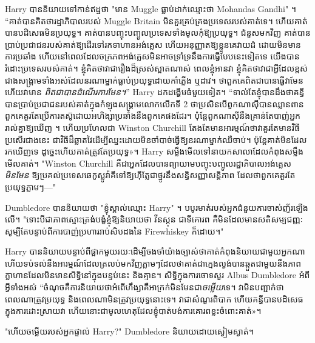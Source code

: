 {Harry បាននិយាយទៅកាន់ឥដ្ឋថា "មាន Muggle ធ្លាប់ដាក់ឈ្មោះថា Mohandas Gandhi" ។ “គាត់បានគិតថារដ្ឋាភិបាលរបស់ Muggle Britain មិនគួរគ្រប់គ្រងប្រទេសរបស់គាត់ទេ។ ហើយគាត់បានបដិសេធមិនប្រយុទ្ធ។ គាត់​បាន​បញ្ចុះបញ្ចូល​ប្រទេស​ទាំងមូល​កុំ​ឱ្យ​ប្រយុទ្ធ​។ ជំនួសមកវិញ គាត់បានប្រាប់ប្រជាជនរបស់គាត់ឱ្យដើរទៅរកទាហានអង់គ្លេស ហើយអនុញ្ញាតឱ្យខ្លួនគេវាយដំ ដោយមិនមានការប្រឆាំង ហើយនៅពេលដែលចក្រភពអង់គ្លេសមិនអាចទ្រាំទ្រនឹងការធ្វើបែបនេះទៀតទេ យើងបានរំដោះប្រទេសរបស់គាត់។ ខ្ញុំ​គិត​ថា​វា​ជា​រឿង​ដ៏​ស្រស់​ស្អាត​ណាស់ ពេល​ខ្ញុំ​អាន​វា ខ្ញុំ​គិត​ថា​វា​ជា​អ្វី​ដែល​ខ្ពស់​ជាង​សង្គ្រាម​ទាំង​អស់​ដែល​នរណា​ម្នាក់​ធ្លាប់​ប្រយុទ្ធ​ដោយ​កាំភ្លើង ឬ​ដាវ។ ថាពួកគេពិតជាបានធ្វើវាមែន ហើយវាមាន \emph{ពិតជាបានដំណើរការមែន។}” Harry ដកដង្ហើមធំមួយទៀត។ “ទាល់តែខ្ញុំបានដឹងថាគន្ធីបានប្រាប់ប្រជាជនរបស់គាត់ក្នុងកំឡុងសង្គ្រាមលោកលើកទី 2 ថាប្រសិនបើពួកណាស៊ីបានឈ្លានពានពួកគេគួរតែប្រើការតស៊ូដោយអហិង្សាប្រឆាំងនឹងពួកគេផងដែរ។ ប៉ុន្តែ​ពួក​ណា​ស៊ី​នឹង​គ្រាន់តែ​បាញ់​អ្នក​រាល់​គ្នា​ឱ្យ​ឃើញ ។ ហើយប្រហែលជា Winston Churchill តែងតែមានអារម្មណ៍ថាវាគួរតែមានវិធីប្រសើរជាងនេះ ជាវិធីដ៏ឆ្លាតវៃដើម្បីឈ្នះដោយមិនចាំបាច់ធ្វើឱ្យនរណាម្នាក់ឈឺចាប់។ ប៉ុន្តែ​គាត់​មិន​ដែល​រក​ឃើញ​ទេ ដូច្នេះ​ហើយ​គាត់​ត្រូវ​តែ​ប្រយុទ្ធ»។ Harry សម្លឹងមើលទៅនាយកសាលាដែលកំពុងសម្លឹងមើលគាត់។ "Winston Churchill គឺជាអ្នកដែលបានព្យាយាមបញ្ចុះបញ្ចូលរដ្ឋាភិបាលអង់គ្លេស\emph{មិនមែន} ឱ្យប្រគល់ប្រទេសឆេកូស្លូវ៉ាគីទៅឱ្យហ៊ីត្លែជាថ្នូរនឹងសន្ធិសញ្ញាសន្តិភាព ដែលថាពួកគេគួរតែប្រយុទ្ធភ្លាមៗ—"

Dumbledore បាននិយាយថា "ខ្ញុំស្គាល់ឈ្មោះ Harry" ។ បបូរ​មាត់​របស់​អ្នក​ជំនួយការ​ចាស់​ញ័រ​ឡើង​លើ។ "ទោះបីជាភាពស្មោះត្រង់បង្ខំខ្ញុំឱ្យនិយាយថា វីនស្តុន ជាទីគោរព គឺមិនដែលមានសតិសម្បជញ្ញៈ សូម្បីតែបន្ទាប់ពីការបាញ់ប្រហាររាប់សិបដងនៃ Firewhiskey ក៏ដោយ។"

Harry បាននិយាយបន្ទាប់ពីផ្អាកមួយរយៈដើម្បីចងចាំយ៉ាងច្បាស់ថាគាត់កំពុងនិយាយជាមួយអ្នកណា ហើយទប់ទល់នឹងអារម្មណ៍ដែលត្រលប់មកវិញភ្លាមៗដែលថាគាត់ជាក្មេងល្ងង់បានឆ្កួតជាមួយនឹងភាពក្លាហានដែលមិនមានសិទ្ធិនៅក្នុងបន្ទប់នេះ និងគ្មាន។ សិទ្ធិក្នុងការចោទសួរ Albus Dumbledore អំពីអ្វីទាំងអស់ “ចំណុចគឺការនិយាយថាអំពើហឹង្សាគឺអាក្រក់មិនមែនជា\emph{ចម្លើយ}ទេ។ វា​មិន​បញ្ជាក់​ថា​ពេលណា​ត្រូវ​ប្រយុទ្ធ និង​ពេលណា​មិន​ត្រូវ​ប្រយុទ្ធ​នោះ​ទេ​។ វា​ជា​សំណួរ​ពិបាក ហើយ​គន្ធី​បាន​បដិសេធ​ក្នុង​ការ​ដោះស្រាយ​វា ហើយ​នោះ​ជា​មូលហេតុ​ដែល​ខ្ញុំ​បាត់បង់​ការ​គោរព​ខ្លះ​ចំពោះ​គាត់»។

"ហើយចម្លើយរបស់អ្នកផ្ទាល់ Harry?" Dumbledore និយាយដោយស្ងៀមស្ងាត់។

}
